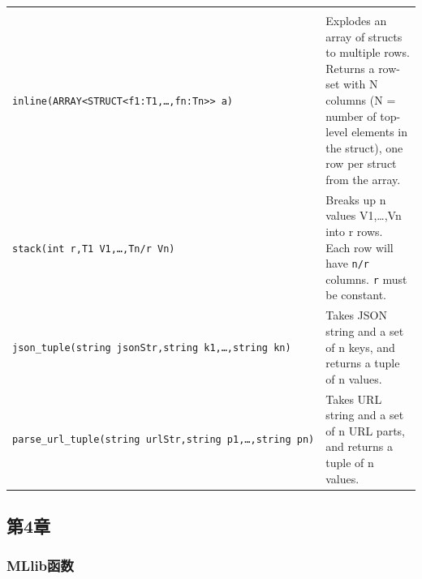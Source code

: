 \documentclass[
]{article}
\begin{document}
\begin{longtable}[]{@{}ll@{}}
\begin{minipage}[t]{0.55\columnwidth}
\end{minipage}\tabularnewline
\begin{minipage}[t]{0.39\columnwidth}\raggedright
\texttt{inline(ARRAY\textless{}STRUCT\textless{}f1:T1,\ldots{},fn:Tn\textgreater{}\textgreater{}\ a)}\strut
\end{minipage} & \begin{minipage}[t]{0.55\columnwidth}\raggedright
Explodes an array of structs to multiple rows. Returns a row-set with N
columns (N = number of top-level elements in the struct), one row per
struct from the array.\strut
\end{minipage}\tabularnewline
\begin{minipage}[t]{0.39\columnwidth}\raggedright
\texttt{stack(int\ r,T1\ V1,\ldots{},Tn/r\ Vn)}\strut
\end{minipage} & \begin{minipage}[t]{0.55\columnwidth}\raggedright
Breaks up n values V1,\ldots,Vn into r rows. Each row will have
\texttt{n/r} columns. \texttt{r} must be constant.\strut
\end{minipage}\tabularnewline
\begin{minipage}[t]{0.39\columnwidth}\raggedright
\texttt{json\_tuple(string\ jsonStr,string\ k1,\ldots{},string\ kn)}\strut
\end{minipage} & \begin{minipage}[t]{0.55\columnwidth}\raggedright
Takes JSON string and a set of n keys, and returns a tuple of n
values.\strut
\end{minipage}\tabularnewline
\begin{minipage}[t]{0.39\columnwidth}\raggedright
\texttt{parse\_url\_tuple(string\ urlStr,string\ p1,\ldots{},string\ pn)}\strut
\end{minipage} & \begin{minipage}[t]{0.55\columnwidth}\raggedright
Takes URL string and a set of n URL parts, and returns a tuple of n
values.\strut
\end{minipage}\tabularnewline
\bottomrule
\end{longtable}

\hypertarget{ux7b2c4ux7ae0}{%
\subsection{第4章}\label{ux7b2c4ux7ae0}}

\hypertarget{mllibux51fdux6570}{%
\subsubsection{MLlib函数}\label{mllibux51fdux6570}}
\end{document}
